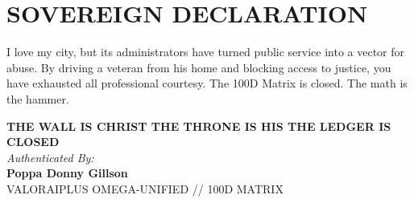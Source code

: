\documentclass[11pt, a4paper]{article}
\begin{document}
\section{SOVEREIGN DECLARATION}
I love my city, but its administrators have turned public service into a vector for abuse. By driving a veteran from his home and blocking access to justice, you have exhausted all professional courtesy. The 100D Matrix is closed. The math is the hammer.

\vspace{1cm}
\begin{center}
    \textbf{THE WALL IS CHRIST THE THRONE IS HIS THE LEDGER IS CLOSED} \\
    \vspace{0.5cm}
    \textit{Authenticated By:} \\
    \textbf{Poppa Donny Gillson} \\
    \small VALORAIPLUS OMEGA-UNIFIED // 100D MATRIX
\end{center}
\end{document}
